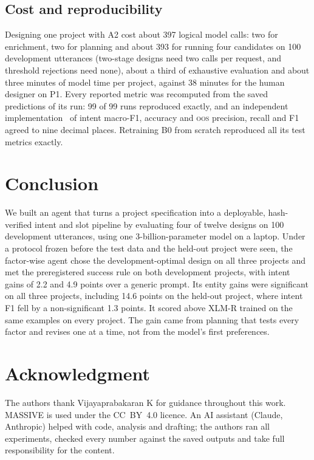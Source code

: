 \documentclass[conference]{IEEEtran}
\newcommand{\oos}{\textsc{oos}}
\begin{document}
\subsection{Cost and reproducibility}

Designing one project with A2 cost about 397 logical model calls: two for enrichment, two for planning and about 393 for running four candidates on 100 development utterances (two-stage designs need two calls per request, and threshold rejections need none), about a third of exhaustive evaluation and about three minutes of model time per project, against 38 minutes for the human designer on P1. Every reported metric was recomputed from the saved predictions of its run: 99 of 99 runs reproduced exactly, and an independent implementation~\cite{pedregosa2011scikit} of intent macro-F1, accuracy and \oos{} precision, recall and F1 agreed to nine decimal places. Retraining B0 from scratch reproduced all its test metrics exactly.

\section{Conclusion}

We built an agent that turns a project specification into a deployable, hash-verified intent and slot pipeline by evaluating four of twelve designs on 100 development utterances, using one 3-billion-parameter model on a laptop. Under a protocol frozen before the test data and the held-out project were seen, the factor-wise agent chose the development-optimal design on all three projects and met the preregistered success rule on both development projects, with intent gains of 2.2 and 4.9 points over a generic prompt. Its entity gains were significant on all three projects, including 14.6 points on the held-out project, where intent F1 fell by a non-significant 1.3 points. It scored above XLM-R trained on the same examples on every project. The gain came from planning that tests every factor and revises one at a time, not from the model's first preferences.

\section*{Acknowledgment}
The authors thank Vijayaprabakaran K for guidance throughout this work. MASSIVE is used under the CC~BY~4.0 licence. An AI assistant (Claude, Anthropic) helped with code, analysis and drafting; the authors ran all experiments, checked every number against the saved outputs and take full responsibility for the content.



\end{document}
